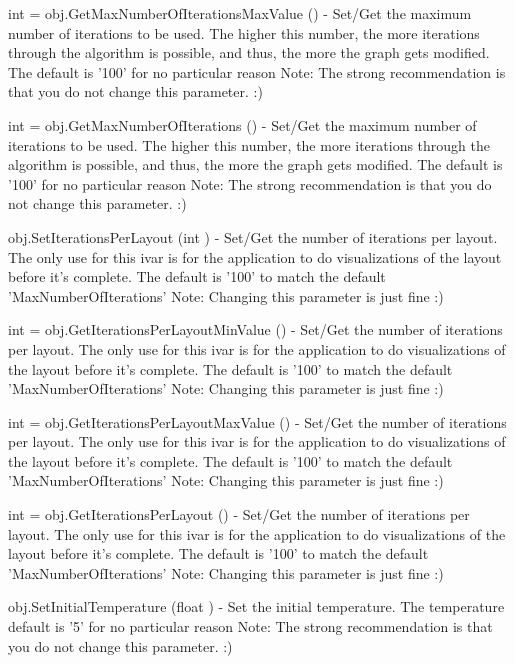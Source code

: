 \begin{DoxyItemize}
\item {\ttfamily int = obj.\-Get\-Max\-Number\-Of\-Iterations\-Max\-Value ()} -\/ Set/\-Get the maximum number of iterations to be used. The higher this number, the more iterations through the algorithm is possible, and thus, the more the graph gets modified. The default is '100' for no particular reason Note\-: The strong recommendation is that you do not change this parameter. \-:)  
\item {\ttfamily int = obj.\-Get\-Max\-Number\-Of\-Iterations ()} -\/ Set/\-Get the maximum number of iterations to be used. The higher this number, the more iterations through the algorithm is possible, and thus, the more the graph gets modified. The default is '100' for no particular reason Note\-: The strong recommendation is that you do not change this parameter. \-:)  
\item {\ttfamily obj.\-Set\-Iterations\-Per\-Layout (int )} -\/ Set/\-Get the number of iterations per layout. The only use for this ivar is for the application to do visualizations of the layout before it's complete. The default is '100' to match the default 'Max\-Number\-Of\-Iterations' Note\-: Changing this parameter is just fine \-:)  
\item {\ttfamily int = obj.\-Get\-Iterations\-Per\-Layout\-Min\-Value ()} -\/ Set/\-Get the number of iterations per layout. The only use for this ivar is for the application to do visualizations of the layout before it's complete. The default is '100' to match the default 'Max\-Number\-Of\-Iterations' Note\-: Changing this parameter is just fine \-:)  
\item {\ttfamily int = obj.\-Get\-Iterations\-Per\-Layout\-Max\-Value ()} -\/ Set/\-Get the number of iterations per layout. The only use for this ivar is for the application to do visualizations of the layout before it's complete. The default is '100' to match the default 'Max\-Number\-Of\-Iterations' Note\-: Changing this parameter is just fine \-:)  
\item {\ttfamily int = obj.\-Get\-Iterations\-Per\-Layout ()} -\/ Set/\-Get the number of iterations per layout. The only use for this ivar is for the application to do visualizations of the layout before it's complete. The default is '100' to match the default 'Max\-Number\-Of\-Iterations' Note\-: Changing this parameter is just fine \-:)  
\item {\ttfamily obj.\-Set\-Initial\-Temperature (float )} -\/ Set the initial temperature. The temperature default is '5' for no particular reason Note\-: The strong recommendation is that you do not change this parameter. \-:)  

\end{DoxyItemize}
